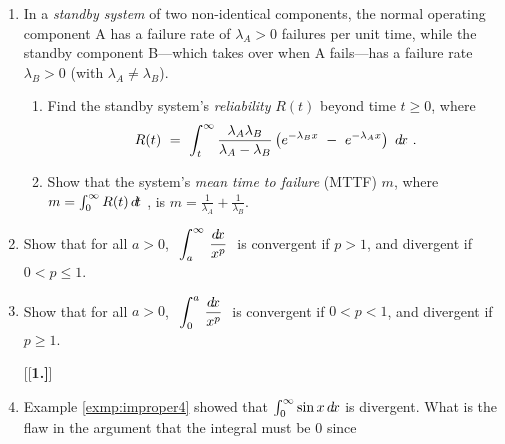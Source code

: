 {\begin{enumerate}[\bfseries 1.]
 \item In a \emph{standby system} of two non-identical components, the normal
 operating component A has a failure rate of $\lambda_A > 0$ failures per unit
 time, while the standby component B---which takes over when A fails---has a
 failure rate $\lambda_B > 0$ (with $\lambda_A \ne \lambda_B$).
 \begin{enumerate}[\bfseries (a)]
  \item Find the standby system's \emph{reliability} $R(t)$ beyond time
  $t \ge 0$, where
\[
R(t) ~=~ \int_t^{\infty} \frac{\lambda_A \lambda_B}{\lambda_A - \lambda_B}
         \left(e^{-\lambda_B x} ~-~ e^{-\lambda_A x}\right)~d\!x ~.
\]
  \item Show that the system's \emph{mean time to failure} (MTTF) $m$, where
  $m = \int_0^{\infty} R(t)\,d\!t~$, is $m = \frac{1}{\lambda_A} +
  \frac{1}{\lambda_B}$.
 \end{enumerate}
 \item Show that for all $a > 0$,
 $~\displaystyle\int_{a}^{\infty}\,\frac{d\!x}{x^p}~$
 is convergent if $p > 1$, and divergent if $0 < p \le 1$.
 \item Show that for all $a > 0$, $~\displaystyle\int_{0}^{a}\,\frac{d\!x}{x^p}~$
 is convergent if $0 < p < 1$, and divergent if $p \ge 1$.
[{[\bfseries 1.]}]
 \item Example \ref{exmp:improper4} showed that $\int_0^{\infty}\sin x\,d\!x$ is
 divergent. What is the flaw in the argument that the integral must be 0 since

\end{enumerate}}
